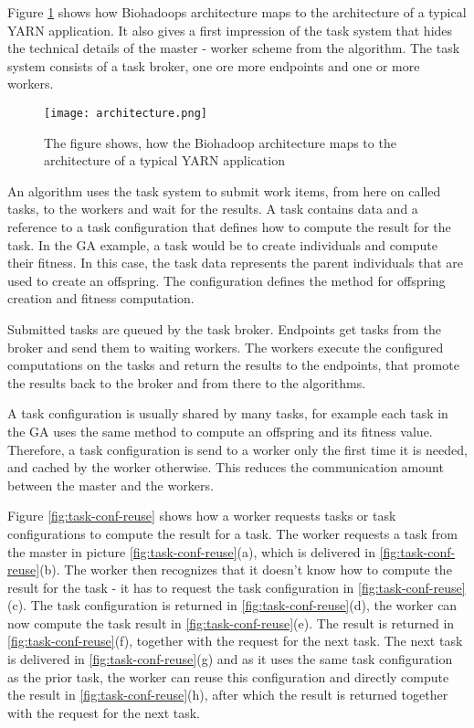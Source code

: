 Figure \ref{fig:architecture} shows how Biohadoops architecture maps to the architecture of a typical YARN application. It also gives a first impression of the task system that hides the technical details of the master - worker scheme from the algorithm. The task system consists of a task broker, one ore more endpoints and one or more workers.

\begin{figure}[ht!]
  \centering
  \texttt{[image: architecture.png]}
  \caption{The figure shows, how the Biohadoop architecture maps to the architecture of a typical YARN application}
  \label{fig:architecture}
\end{figure}

An algorithm uses the task system to submit work items, from here on called tasks, to the workers and wait for the results. A task contains data and a reference to a task configuration that defines how to compute the result for the task. In the GA example, a task would be to create individuals and compute their fitness. In this case, the task data represents the parent individuals that are used to create an offspring. The configuration defines the method for offspring creation and fitness computation.

Submitted tasks are queued by the task broker. Endpoints get tasks from the broker and send them to waiting workers. The workers execute the configured computations on the tasks and return the results to the endpoints, that promote the results back to the broker and from there to the algorithms.

A task configuration is usually shared by many tasks, for example each task in the GA uses the same method to compute an offspring and its fitness value. Therefore, a task configuration is send to a worker only the first time it is needed, and cached by the worker otherwise. This reduces the communication amount between the master and the workers.

Figure \ref{fig:task-conf-reuse} shows how a worker requests tasks or task configurations to compute the result for a task. The worker requests a task from the master in picture \ref{fig:task-conf-reuse}(a), which is delivered in \ref{fig:task-conf-reuse}(b). The worker then recognizes that it doesn't know how to compute the result for the task - it has to request the task configuration in \ref{fig:task-conf-reuse}(c). The task configuration is returned in \ref{fig:task-conf-reuse}(d), the worker can now compute the task result in \ref{fig:task-conf-reuse}(e). The result is returned in \ref{fig:task-conf-reuse}(f), together with the request for the next task. The next task is delivered in \ref{fig:task-conf-reuse}(g) and as it uses the same task configuration as the prior task, the worker can reuse this configuration and directly compute the result in \ref{fig:task-conf-reuse}(h), after which the result is returned together with the request for the next task.

